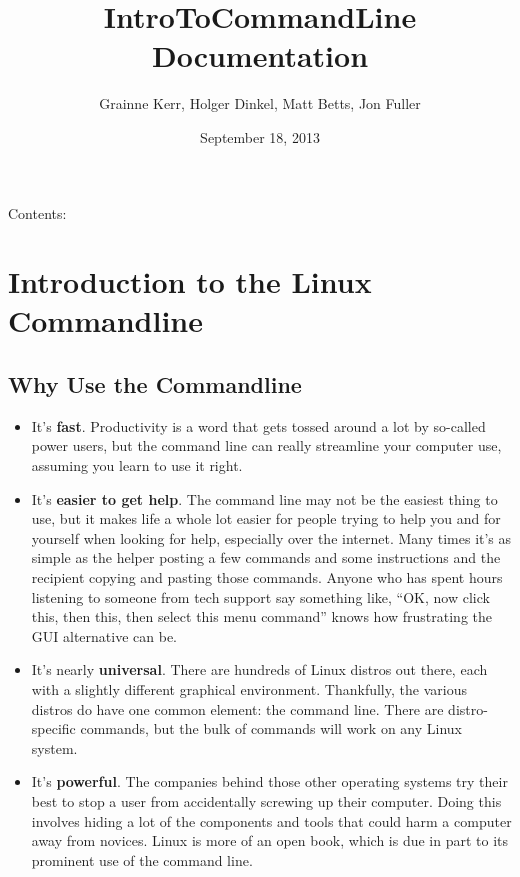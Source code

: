 \documentclass[letterpaper,10pt,english]{sphinxmanual}
\title{IntroToCommandLine Documentation}
\date{September 18, 2013}
\author{Grainne Kerr, Holger Dinkel, Matt Betts, Jon Fuller}
\begin{document}
\maketitle
\tableofcontents
{}\label{IntroToCommandLine::doc}


Contents:


\chapter{Introduction to the Linux Commandline}
\label{introduction:welcome-to-introduction-to-the-command-line-for-ngs-documentation}\label{introduction:introduction-to-the-linux-commandline}\label{introduction::doc}

\section{Why Use the Commandline}
\label{introduction:why-use-the-commandline}\begin{itemize}
\item {} 
It's \textbf{fast}. Productivity is a word that gets tossed around a lot by so-called power users, but the command line can really streamline your computer use, assuming you learn to use it right.

\item {} 
It's \textbf{easier to get help}. The command line may not be the easiest thing to use, but it makes life a whole lot easier for people trying to help you and for yourself when looking for help, especially over the internet. Many times it's as simple as the helper posting a few commands and some instructions and the recipient copying and pasting those commands. Anyone who has spent hours listening to someone from tech support say something like, “OK, now click this, then this, then select this menu command” knows how frustrating the GUI alternative can be.

\item {} 
It's nearly \textbf{universal}. There are hundreds of Linux distros out there, each with a slightly different graphical environment. Thankfully, the various distros do have one common element: the command line. There are distro-specific commands, but the bulk of commands will work on any Linux system.

\item {} 
It's \textbf{powerful}. The companies behind those other operating systems try their best to stop a user from accidentally screwing up their computer. Doing this involves hiding a lot of the components and tools that could harm a computer away from novices. Linux is more of an open book, which is due in part to its prominent use of the command line.

\end{itemize}
\end{document}
